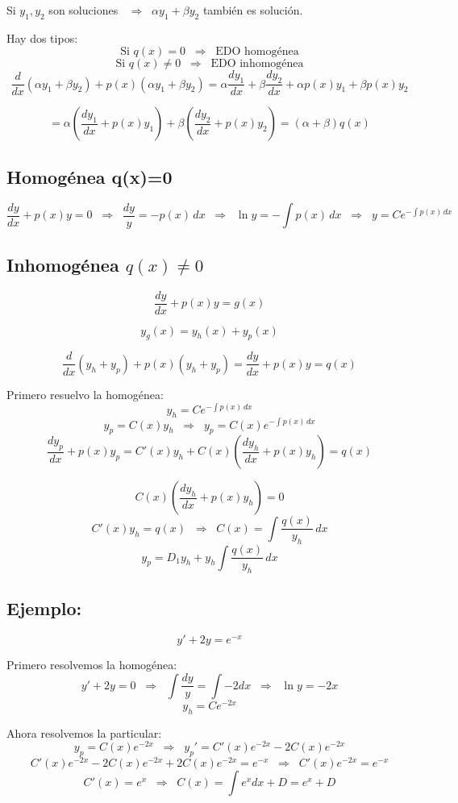 \documentclass[a4paper,12pt]{article}
\begin{document}
Si $y_1,y_2$ son soluciones $\;\;\Rightarrow\;\;\alpha y_1+\beta y_2$ también es solución.

\medskip
\newpage
Hay dos tipos:
\[
\text{Si } q(x)=0 \;\;\Rightarrow\;\; \text{EDO homogénea}
\]
\[
\text{Si } q(x)\neq 0 \;\;\Rightarrow\;\; \text{EDO inhomogénea}
\]
\[
\frac{d}{dx}(\alpha y_1 + \beta y_2) + p(x)(\alpha y_1 + \beta y_2) 
= \alpha \frac{dy_1}{dx} + \beta \frac{dy_2}{dx} + \alpha p(x)y_1 + \beta p(x)y_2
\]

\[
= \alpha\left(\frac{dy_1}{dx}+p(x)y_1\right)+\beta\left(\frac{dy_2}{dx}+p(x)y_2\right)
= (\alpha+\beta)q(x)
\]

\subsection{Homogénea q(x)=0}

\[
\frac{dy}{dx}+p(x)y=0
\;\;\Rightarrow\;\;
\frac{dy}{y}=-p(x)\,dx
\;\;\Rightarrow\;\;
\ln y = -\int p(x)\,dx
\;\;\Rightarrow\;\;
y=Ce^{-\int p(x)\,dx}
\]
\subsection*{Inhomogénea $q(x)\neq 0$}
\[
\frac{dy}{dx}+p(x)y=g(x)
\]

\[
y_g(x)=y_h(x)+y_p(x)
\]

\[
\frac{d}{dx}(y_h+y_p)+p(x)(y_h+y_p)=\frac{dy}{dx}+p(x)y=q(x)
\]

Primero resuelvo la homogénea:
\[
y_h = C e^{-\int p(x)\,dx}
\]
\[
y_p = C(x)y_h \;\;\Rightarrow\;\; y_p = C(x)e^{-\int p(x)\,dx}
\]
\[
\frac{dy_p}{dx}+p(x)y_p = C'(x)y_h + C(x)\left(\frac{dy_h}{dx}+p(x)y_h\right)=q(x)
\]

\[
C(x)\left(\frac{dy_h}{dx}+p(x)y_h\right)=0
\]
\[
C'(x)y_h=q(x)
\;\;\Rightarrow\;\;
C(x)=\int \frac{q(x)}{y_h}\,dx
\]
\[
y_p = D_1 y_h + y_h \int \frac{q(x)}{y_h}\,dx
\]
\subsection*{Ejemplo:}

\[
y' + 2y = e^{-x}
\]

Primero resolvemos la homogénea:
\[
y' + 2y = 0 \;\;\Rightarrow\;\; \int \frac{dy}{y} = \int -2dx 
\;\;\Rightarrow\;\; \ln y = -2x
\]
\[
y_h = Ce^{-2x}
\]

Ahora resolvemos la particular:
\[
y_p = C(x)e^{-2x} \;\;\Rightarrow\;\; 
y_p' = C'(x)e^{-2x} - 2C(x)e^{-2x}
\]
\[
C'(x)e^{-2x} - 2C(x)e^{-2x} + 2C(x)e^{-2x} = e^{-x} 
\;\;\Rightarrow\;\; C'(x)e^{-2x} = e^{-x}
\]
\[
C'(x) = e^x \;\;\Rightarrow\;\; C(x) = \int e^x dx + D = e^x + D
\]
\end{document}
